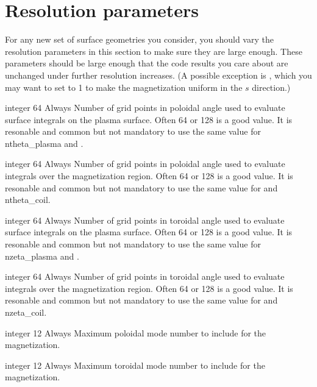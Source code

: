\myhrule

\section{Resolution parameters}

For any new set of surface geometries you consider, you should vary the resolution parameters in this section to make sure
they are large enough.  These parameters should be large enough that the code results you care about are unchanged under further
resolution increases. (A possible exception is , which you may want to set to 1 to make the magnetization
uniform in the $s$ direction.)

\myhrule

{integer}
{64}
{Always}
{Number of grid points in poloidal angle used to evaluate surface integrals on the plasma surface.
Often 64 or 128 is a good value.
It is resonable and common but not mandatory to use the same value for {\ttfamily ntheta\_plasma} and .}

\myhrule

{integer}
{64}
{Always}
{Number of grid points in poloidal angle used to evaluate integrals over the magnetization region.
Often 64 or 128 is a good value.
It is resonable and common but not mandatory to use the same value for  and {\ttfamily ntheta\_coil}.}

\myhrule


{integer}
{64}
{Always}
{Number of grid points in toroidal angle used to evaluate surface integrals on the plasma surface.
Often 64 or 128 is a good value.
It is resonable and common but not mandatory to use the same value for {\ttfamily nzeta\_plasma} and .}

\myhrule

{integer}
{64}
{Always}
{Number of grid points in toroidal angle used to evaluate integrals over the magnetization region.
Often 64 or 128 is a good value.
It is resonable and common but not mandatory to use the same value for  and {\ttfamily nzeta\_coil}.}

\myhrule

{integer}
{12}
{Always}
{Maximum poloidal mode number to include for the magnetization.
}

\myhrule

{integer}
{12}
{Always}
{
Maximum toroidal mode number to include for the magnetization.
}

